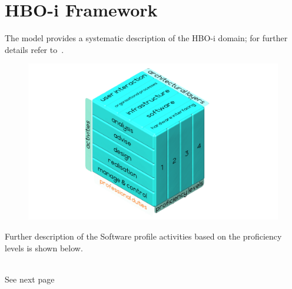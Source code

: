 \chapter{HBO-i Framework}\label{appendices:hboi}
The model provides a systematic description of the HBO-i domain; for further details refer to~\cite{hboi}.
\begin{figure}[h]
    \centering
   \includegraphics[width=\textwidth]{appendices/hboi/HBOI_model.png}
    \label{fig:hboi_model}
\end{figure}

\noindent Further description of the Software profile activities based on the proficiency levels is shown below.\\\\
\begin{minipage}{0.5\textwidth}
\begin{flushleft}
\end{flushleft}
\end{minipage}
\hfill
\begin{minipage}{0.5\textwidth}
\begin{flushright}
   See next page
\end{flushright}
\end{minipage}

